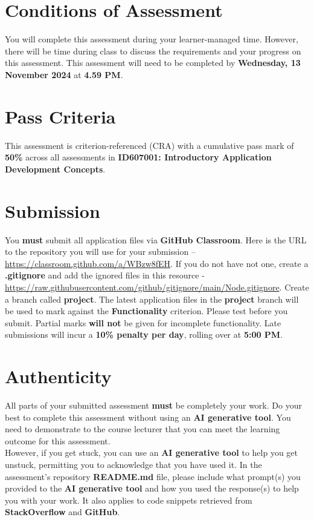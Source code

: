 \documentclass{article}
\begin{document}
\section*{Conditions of Assessment}
You will complete this assessment during your learner-managed time. However, there will be time during class to discuss the requirements and your progress on this assessment. This assessment will need to be completed by \textbf{Wednesday, 13 November 2024} at \textbf{4.59 PM}. 

\section*{Pass Criteria}
This assessment is criterion-referenced (CRA) with a cumulative pass mark of \textbf{50\%} across all assessments in \textbf{ID607001: Introductory Application Development Concepts}.

\section*{Submission}
You \textbf{must} submit all application files via \textbf{GitHub Classroom}. Here is the URL to the repository you will use for your submission – \href{https://classroom.github.com/a/WBzw8fEH}{https://classroom.github.com/a/WBzw8fEH}. If you do not have not one, create a \textbf{.gitignore} and add the ignored files in this resource - \href{https://raw.githubusercontent.com/github/gitignore/main/Node.gitignore}{https://raw.githubusercontent.com/github/gitignore/main/Node.gitignore}. Create a branch called \textbf{project}. The latest application files in the \textbf{project} branch will be used to mark against the \textbf{Functionality} criterion. Please test before you submit. Partial marks \textbf{will not} be given for incomplete functionality. Late submissions will incur a \textbf{10\% penalty per day}, rolling over at \textbf{5:00 PM}.


\section*{Authenticity}
All parts of your submitted assessment \textbf{must} be completely your work. Do your best to complete this assessment without using an \textbf{AI generative tool}. You need to demonstrate to the course lecturer that you can meet the learning outcome for this assessment. \\
 
 However, if you get stuck, you can use an \textbf{AI generative tool} to help you get unstuck, permitting you to acknowledge that you have used it. In the assessment's repository \textbf{README.md} file, please include what prompt(s) you provided to the \textbf{AI generative tool} and how you used the response(s) to help you with your work. It also applies to code snippets retrieved from \textbf{StackOverflow} and \textbf{GitHub}. \\
 
\end{document}
